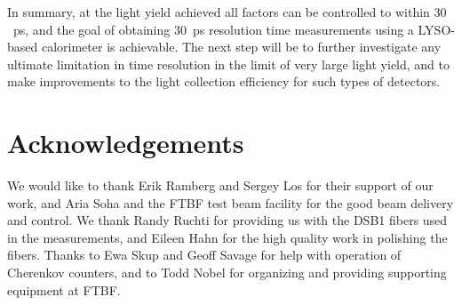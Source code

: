 \documentclass[12pt]{article}
\begin{document}
In summary, at the light yield achieved all factors can be controlled
to within $30$~ps, and the goal of obtaining $30$~ps
resolution time measurements using a LYSO-based calorimeter
is achievable. The next step will be to further 
investigate any ultimate limitation in time 
resolution in the limit of very large light yield,
and to make improvements to the light collection efficiency 
for such types of detectors.

\section{Acknowledgements}
We would like to thank Erik Ramberg and Sergey Los for their support of our work, and Aria Soha and the FTBF test beam facility for the
good beam delivery and control. We thank Randy Ruchti for providing us
with the DSB1 fibers used in the measurements, and Eileen Hahn for the
high quality work in polishing the fibers. Thanks to Ewa Skup and Geoff
Savage for help with operation of Cherenkov counters, and to Todd Nobel
for organizing and providing supporting equipment at FTBF.


{}

\end{document}
